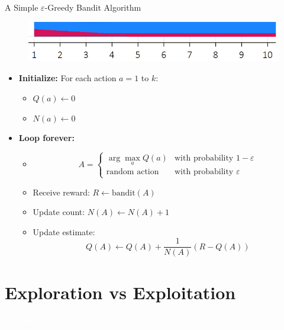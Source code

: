 \documentclass[11pt,table]{beamer}
\begin{document}
\begin{frame}{A Simple $\varepsilon$-Greedy Bandit Algorithm}
\begin{figure}
    \centering
    \includegraphics[width=0.9\linewidth]{figures/epsilon greedy 2.png}
\end{figure}
\begin{tcolorbox}[colframe=black, boxrule=1pt, sharp corners]
\begin{itemize}\small
    \item \textbf{Initialize:} For each action $a = 1$ to $k$:
    \begin{itemize}
        \item $Q(a) \gets 0$ \hfill 
        \item $N(a) \gets 0$ \hfill 
    \end{itemize}
    
    \item \textbf{Loop forever:}
    \begin{itemize}\small\vspace*{-2.5ex}
		 \item[]
       \[
        A = 
        \begin{cases}
            \arg\max_a Q(a) & \text{with probability } 1 - \varepsilon \\
            \text{random action} & \text{with probability } \varepsilon
        \end{cases}
        \]
        \item Receive reward: $R \gets \text{bandit}(A)$
        \item Update count: $N(A) \gets N(A) + 1$
        \item Update estimate:\vspace*{-2ex}
        \[
        Q(A) \gets Q(A) + \frac{1}{N(A)} (R - Q(A))
        \]
    \end{itemize}
\end{itemize}
\end{tcolorbox}

\end{frame}

\section{Exploration vs Exploitation}
{
\begin{frame}
\centering
\Huge
\textcolor{white}{Exploration vs Exploitation}
\thispagestyle{empty}
\end{frame}
}
\end{document}
